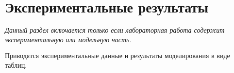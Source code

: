 \section*{Экспериментальные результаты}
\textit{Данный раздел включается только если лабораторная работа содержит экспериментальную или модельную часть.}

Приводятся экспериментальные данные и результаты моделирования в виде таблиц.